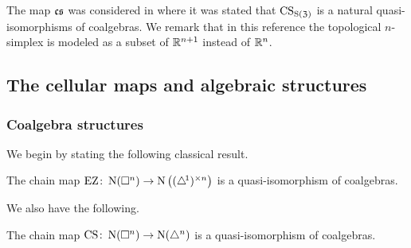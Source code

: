 The map $\operatorname{\mathfrak{cs}}$ was considered in \cite[p. 442]{serre1951homologie} where it was stated that $\operatorname{CS}_{\operatorname{S}(\mathfrak{Z})}$ is a natural quasi-isomorphisms of coalgebras.
We remark that in this reference the topological $n$-simplex is modeled as a subset of $\mathbb{R}^{n+1}$ instead of $\mathbb{R}^n$.

%

\subsection{The cellular maps and algebraic structures}

\subsubsection{Coalgebra structures}

We begin by stating the following classical result.

\begin{proposition} \label{p:ez is coalgebra map]}
	The chain map $\operatorname{EZ} \colon \operatorname{N}(\square^n) \to \operatorname{N} \big( (\triangle^{\!1})^{\times n} \big)$ is a quasi-isomorphism of coalgebras.
\end{proposition}

We also have the following.

\begin{proposition}
	The chain map $\operatorname{CS} \colon \operatorname{N}(\square^n) \to \operatorname{N}(\triangle^n)$ is a quasi-isomorphism of coalgebras.
\end{proposition}

